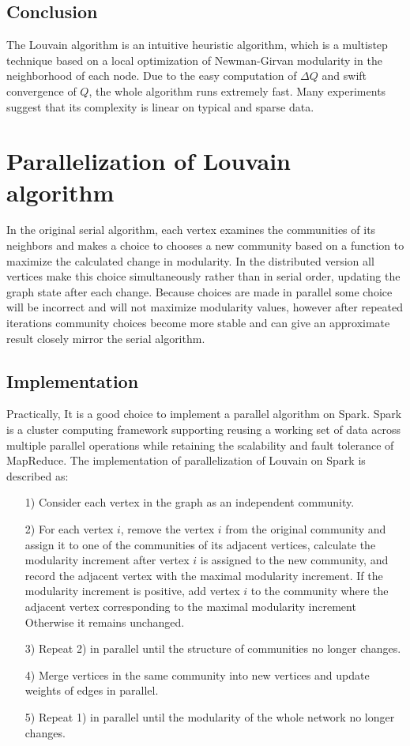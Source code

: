 \documentclass[11pt]{article}
\begin{document}
\subsection{Conclusion}

The Louvain algorithm is an intuitive heuristic algorithm, which is a multistep technique based on a local optimization of Newman-Girvan modularity in the neighborhood of each node. Due to the easy computation of $\Delta{Q}$ and swift convergence of $Q$, the whole algorithm runs extremely fast. Many experiments suggest that its complexity is linear on typical and sparse data.  

\section{Parallelization of Louvain algorithm}

In the original serial algorithm, each vertex examines the communities of its neighbors and makes a choice to chooses a new community based on a function to maximize the calculated change in modularity.
In the distributed version all vertices make this choice simultaneously rather than in serial order, updating the graph state after each change. Because choices are made in parallel some choice will be incorrect and will not maximize modularity values, however after repeated iterations community choices become more stable and can give an approximate result closely mirror the serial algorithm.

\subsection{Implementation}

Practically, It is a good choice to implement a parallel algorithm on Spark.\cite{spark} Spark is a cluster computing framework supporting reusing a working set of data across multiple parallel operations while retaining the scalability and fault tolerance of MapReduce.\cite{mapreduce} The implementation of parallelization of Louvain on Spark is described as:
\begin{itemize}
  \item [1)] Consider each vertex in the graph as an independent community.
  \item [2)] For each vertex $i$, remove the vertex $i$ from the original community and assign it to one of the communities of its adjacent vertices, calculate the modularity increment after vertex $i$ is assigned to the new community, and record the adjacent vertex with the maximal modularity increment. If the modularity increment is positive, add vertex $i$ to the community where the adjacent vertex corresponding to the maximal modularity increment Otherwise it remains unchanged.
  \item [3)] Repeat 2) in parallel until the structure of communities no longer changes.
  \item [4)] Merge vertices in the same community into new vertices and update weights of edges in parallel.
  \item [5)] Repeat 1) in parallel until the modularity of the whole network no longer changes.
\end{itemize}
\end{document}
